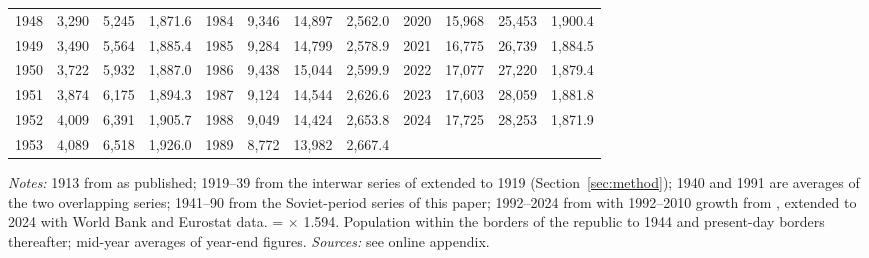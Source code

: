 \begin{longtable}{rrrr@{\hspace{1em}}rrrr@{\hspace{1em}}rrrr}
1948 & 3,290 & 5,245 & 1,871.6 & 1984 & 9,346 & 14,897 & 2,562.0 & 2020 & 15,968 & 25,453 & 1,900.4 \\
1949 & 3,490 & 5,564 & 1,885.4 & 1985 & 9,284 & 14,799 & 2,578.9 & 2021 & 16,775 & 26,739 & 1,884.5 \\
1950 & 3,722 & 5,932 & 1,887.0 & 1986 & 9,438 & 15,044 & 2,599.9 & 2022 & 17,077 & 27,220 & 1,879.4 \\
1951 & 3,874 & 6,175 & 1,894.3 & 1987 & 9,124 & 14,544 & 2,626.6 & 2023 & 17,603 & 28,059 & 1,881.8 \\
1952 & 4,009 & 6,391 & 1,905.7 & 1988 & 9,049 & 14,424 & 2,653.8 & 2024 & 17,725 & 28,253 & 1,871.9 \\
1953 & 4,089 & 6,518 & 1,926.0 & 1989 & 8,772 & 13,982 & 2,667.4 &  & & &  \\
\end{longtable}
\vspace{-1.2em}\noindent\begin{minipage}{\textwidth}\footnotesize \textit{Notes:} 1913 from \textcite{norkusmark2021} as published; 1919--39 from the interwar series of \textcite{Klimantas2024} extended to 1919 (Section~\ref{sec:method}); 1940 and 1991 are averages of the two overlapping series; 1941--90 from the Soviet-period series of this paper; 1992--2024 from \textcite{mpd2023} with 1992--2010 growth from \textcite{wdi2024}, extended to 2024 with World Bank and Eurostat data. \intltwenty{} = \intlnineteen{} $\times$ 1.594. Population within the borders of the republic to 1944 and present-day borders thereafter; mid-year averages of year-end figures. \textit{Sources:} see online appendix.\end{minipage}\vspace{1em}
